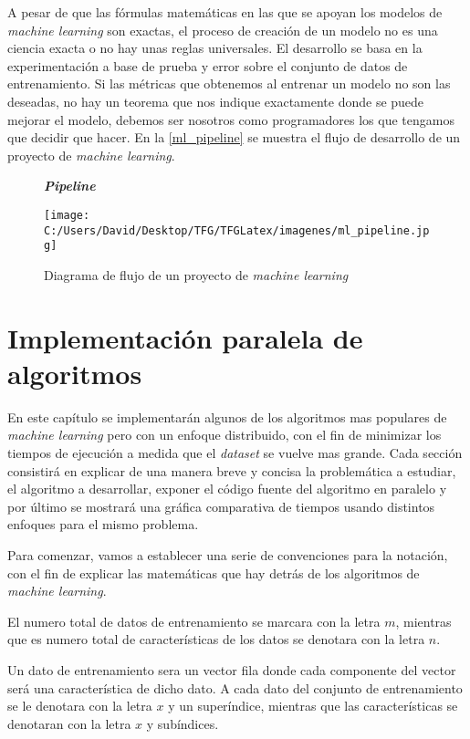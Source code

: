 A pesar de que las fórmulas matemáticas en las que se apoyan los modelos de \textit{machine learning} son
exactas, el proceso de creación de un modelo no es una ciencia exacta o no hay unas reglas universales. 
El desarrollo se basa en la experimentación a base de prueba y error sobre el conjunto de datos de entrenamiento.
Si las métricas que obtenemos al entrenar un modelo no son las deseadas, no hay un teorema que nos indique
exactamente donde se puede mejorar el modelo, debemos ser nosotros como programadores los que tengamos que
decidir que hacer.\hfill \break
En la \autoref{ml_pipeline} se muestra el flujo de desarrollo de un proyecto de \textit{machine learning}.

\begin{figure}[h]
  \centering
  \textbf{\textbf{\textit{Pipeline}}}\par\medskip
  \texttt{[image: C:/Users/David/Desktop/TFG/TFGLatex/imagenes/ml\_pipeline.jpg]}
  \caption[\textit{Machine learning pipeline}]{Diagrama de flujo de un proyecto de \textit{machine learning}}
  \label{ml_pipeline}
\end{figure}

\clearpage


\chapter[Implementación paralela]{Implementación paralela de algoritmos}\label{chap:implementacion_paralela}
En este capítulo se implementarán algunos de los algoritmos mas populares de \textit{machine learning} 
pero con un enfoque distribuido, con el fin de minimizar los tiempos de ejecución a medida que
el \textit{dataset} se vuelve mas grande.
Cada sección consistirá en explicar de una manera breve y concisa la problemática a estudiar, 
el algoritmo a desarrollar, exponer el código fuente del algoritmo en paralelo y por último se mostrará
una gráfica comparativa de tiempos usando distintos enfoques para el mismo problema.
\newline

Para comenzar, vamos a establecer una serie de convenciones para la notación, con el fin de explicar
las matemáticas que hay detrás de los algoritmos de \textit{machine learning}.

El numero total de datos de entrenamiento se marcara con la letra $m$, mientras que es numero total
de características de los datos se denotara con la letra $n$.

Un dato de entrenamiento sera un vector fila donde cada componente del vector será una característica
de dicho dato. A cada dato del conjunto de entrenamiento se le denotara con la letra $x$ y un 
superíndice, mientras que las características se denotaran con la letra $x$ y subíndices. 

